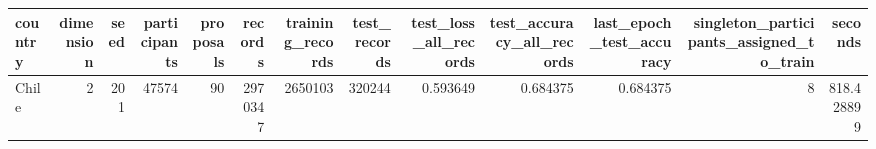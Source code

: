\begin{tabular}{lrrrrrrrrrrrr}
\toprule
country & dimension & seed & participants & proposals & records & training_records & test_records & test_loss_all_records & test_accuracy_all_records & last_epoch_test_accuracy & singleton_participants_assigned_to_train & seconds \\
\midrule
Chile & 2 & 201 & 47574 & 90 & 2970347 & 2650103 & 320244 & 0.593649 & 0.684375 & 0.684375 & 8 & 818.428899 \\
\bottomrule
\end{tabular}
